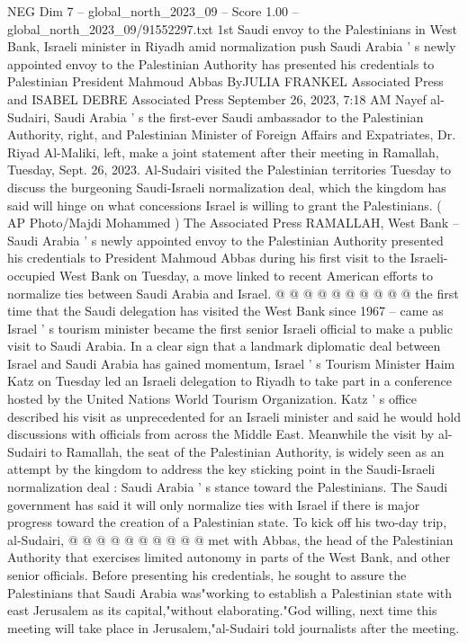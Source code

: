 \begin{textsample}{NEG Dim 7 – global\_north\_2023\_09 – Score 1.00 – global\_north\_2023\_09/91552297.txt}  \label{ex:f7_neg_083}
1st Saudi envoy to the Palestinians in West Bank, Israeli minister in Riyadh amid normalization push Saudi Arabia ' s newly appointed envoy to the Palestinian Authority has presented his credentials to Palestinian President Mahmoud Abbas ByJULIA FRANKEL Associated Press and ISABEL DEBRE Associated Press September 26, 2023, 7:18 AM Nayef al-Sudairi, Saudi Arabia ' s the first-ever Saudi ambassador to the Palestinian Authority, right, and Palestinian Minister of Foreign Affairs and Expatriates, Dr.
Riyad Al-Maliki, left, make a joint statement after their meeting in Ramallah, Tuesday, Sept. 26, 2023.
Al-Sudairi visited the Palestinian territories Tuesday to discuss the burgeoning Saudi-Israeli normalization deal, which the kingdom has said will hinge on what concessions Israel is willing to grant the Palestinians. ( AP Photo/Majdi Mohammed ) The Associated Press RAMALLAH, West Bank -- Saudi Arabia ' s newly appointed envoy to the Palestinian Authority presented his credentials to President Mahmoud Abbas during his first visit to the Israeli-occupied West Bank on Tuesday, a move linked to recent American efforts to normalize ties between Saudi Arabia and Israel. @ @ @ @ @ @ @ @ @ @ the first time that the Saudi delegation has visited the West Bank since 1967 -- came as Israel ' s tourism minister became the first senior Israeli official to make a public visit to Saudi Arabia.
In a clear sign that a landmark diplomatic deal between Israel and Saudi Arabia has gained momentum, Israel ' s Tourism Minister Haim Katz on Tuesday led an Israeli delegation to Riyadh to take part in a conference hosted by the United Nations World Tourism Organization.
Katz ' s office described his visit as unprecedented for an Israeli minister and said he would hold discussions with officials from across the Middle East.
Meanwhile the visit by al-Sudairi to Ramallah, the seat of the Palestinian Authority, is widely seen as an attempt by the kingdom to address the key sticking point in the Saudi-Israeli normalization deal : Saudi Arabia ' s stance toward the Palestinians.
The Saudi government has said it will only normalize ties with Israel if there is major progress toward the creation of a Palestinian state.
To kick off his two-day trip, al-Sudairi, @ @ @ @ @ @ @ @ @ @ met with Abbas, the head of the Palestinian Authority that exercises limited autonomy in parts of the West Bank, and other senior officials.
Before presenting his credentials, he sought to assure the Palestinians that Saudi Arabia was"working to establish a Palestinian state with east Jerusalem as its capital,"without elaborating."God willing, next time this meeting will take place in Jerusalem,"al-Sudairi told journalists after the meeting.

\end{textsample}
